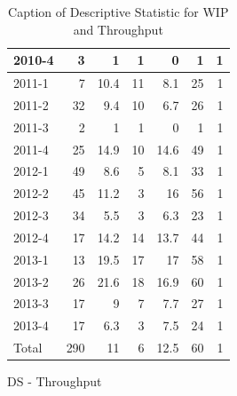\documentclass[UKenglish]{ifimaster}  %
\begin{document}
\begin{appendices}
\begin{table}[!htbp]
\begin{adjustwidth}{-1.5cm}{}
\begin{subfigure}[b]{0.3\textwidth}
{\begin{tabular}{ | l | r | r | r | r | r | r | }
 2010-4  & 3 & 1 & 1 & 0 &1 & 1 \\ \hline
 2011-1  & 7 & 10.4 & 11 & 8.1 & 25 & 1 \\ \hline
 2011-2  & 32 & 9.4 & 10 & 6.7 & 26 & 1 \\ \hline
 2011-3  & 2 & 1 & 1 & 0 &1 & 1 \\ \hline
 2011-4  & 25 & 14.9 & 10 & 14.6 & 49 & 1 \\ \hline
 2012-1  & 49 & 8.6 & 5 & 8.1 & 33 & 1 \\ \hline
 2012-2  & 45 & 11.2 & 3 & 16 & 56 & 1 \\ \hline
 2012-3  & 34 & 5.5 & 3 & 6.3 & 23 & 1 \\ \hline
 2012-4  & 17 & 14.2 & 14 & 13.7 & 44 & 1 \\ \hline
 2013-1  & 13 & 19.5 & 17 & 17 & 58 & 1 \\ \hline
 2013-2  & 26 & 21.6 & 18 & 16.9 & 60 & 1 \\ \hline
 2013-3  & 17 & 9 & 7 & 7.7 & 27 & 1 \\ \hline
 2013-4  & 17 & 6.3 & 3 & 7.5 & 24 & 1 \\ \hline
 Total & 290 & 11 & 6 & 12.5 & 60 & 1 \\ \hline
\end{tabular}
}
\caption{DS - Throughput}
 \label{DS:Throughput:1}
\end{subfigure}
\end{adjustwidth}
\caption[Optional caption for list of figures]{Caption of Descriptive Statistic for WIP and Throughput}
\label{DS:1:1}
\end{table}



\end{appendices}
\end{document}
